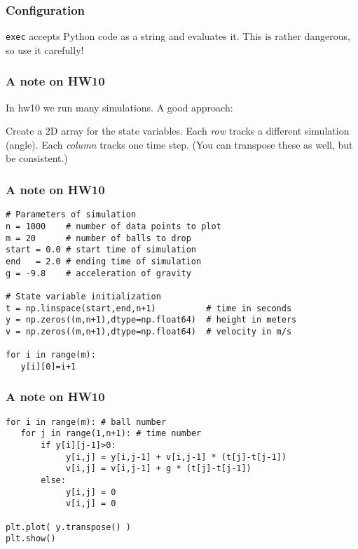\documentclass[11pt]{beamer}
\begin{document}
\begin{frame}[fragile]
  \frametitle{Configuration}
  \Enlarge

  \begin{enumerate}
  \myitem  \texttt{exec} accepts Python code as a string and evaluates it. \pause
  \myitem  This is rather dangerous, so use it carefully!
  \end{enumerate}
\end{frame}


\begin{frame}[fragile]
	\frametitle{A note on HW10}
	\Enlarge
	
	\begin{enumerate}
		\myitem  In hw10 we run many simulations.
		\myitem  A good approach:
		\begin{enumerate}
			\mysubitem  Create a 2D array for the state variables.
			\mysubitem  Each \emph{row} tracks a different simulation (angle).
			\mysubitem  Each \emph{column} tracks one time step.
			\mysubitem  (You can transpose these as well, but be consistent.)
		\end{enumerate}
	\end{enumerate}
\end{frame}

\begin{frame}[fragile]
	\frametitle{A note on HW10}
	
	\begin{Verbatim}
# Parameters of simulation
n = 1000    # number of data points to plot
m = 20      # number of balls to drop
start = 0.0 # start time of simulation
end   = 2.0 # ending time of simulation
g = -9.8    # acceleration of gravity
	
# State variable initialization
t = np.linspace(start,end,n+1)          # time in seconds
y = np.zeros((m,n+1),dtype=np.float64)  # height in meters
v = np.zeros((m,n+1),dtype=np.float64)  # velocity in m/s
	
for i in range(m):
   y[i][0]=i+1
	\end{Verbatim}
\end{frame}

\begin{frame}[fragile]
	\frametitle{A note on HW10}
	
	\begin{Verbatim}
for i in range(m): # ball number
   for j in range(1,n+1): # time number
       if y[i][j-1]>0:
            y[i,j] = y[i,j-1] + v[i,j-1] * (t[j]-t[j-1])
            v[i,j] = v[i,j-1] + g * (t[j]-t[j-1])
       else:
            y[i,j] = 0
            v[i,j] = 0
	
plt.plot( y.transpose() )
plt.show()
	\end{Verbatim}
\end{frame}
\end{document}
